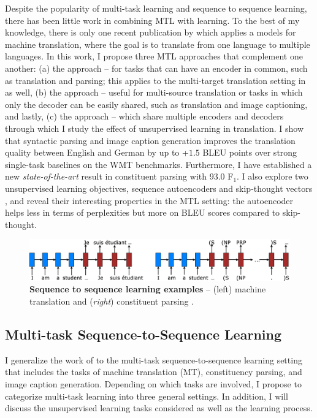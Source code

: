 Despite the popularity of multi-task learning and sequence to sequence
learning, there has been little work in combining MTL with \ssl{}
learning. To the best of my knowledge, there is only one recent
publication by  which applies a \ssl{} models for machine
translation, where the goal is to translate from one language to
multiple languages.
In this work, I propose three MTL
approaches that complement one another: (a) the {\it \otm} approach -- for
tasks that can have an encoder in common, such as translation and parsing; this 
applies to the multi-target translation setting in \cite{dong15} as well, (b)
the {\it \mto} approach -- useful for multi-source
translation or tasks in which only the decoder can be easily shared,
such as translation and image captioning, and lastly, (c) the {\it \mtm} approach -- which share
multiple encoders and decoders through which I study the effect of unsupervised
learning in translation.
I show
that syntactic parsing and image caption generation improves the
translation quality between English and German by up to +$1.5$ BLEU points over
strong single-task baselines on the WMT benchmarks. 
Furthermore, I have established a new {\it state-of-the-art} result in
constituent parsing with 93.0 F$_1$.
I also explore two unsupervised learning
objectives, sequence autoencoders \cite{dai15} and skip-thought vectors
\cite{kiros15skip}, and reveal their interesting properties in the MTL setting: the autoencoder helps less in terms of
  perplexities but more on BLEU scores compared to skip-thought.
\begin{figure}%
\centering
\includegraphics[width=1\textwidth, clip=true, trim= 0 0 0
0]{img/6-1_seq2seq}
\caption[Sequence to sequence learning examples]{{\bf Sequence to sequence learning examples} -- (left) machine
translation \cite{sutskever14} and ({\it right}) constituent parsing
\cite{vinyals15grammar}.}
\label{f:s2s}
\end{figure}

\subsection{Multi-task Sequence-to-Sequence Learning}
\label{subsec:multi}
I generalize the work of \citet{dong15} to the multi-task sequence-to-sequence
learning setting that includes the tasks of machine translation (MT),
constituency parsing, and image caption generation. Depending on which tasks 
are involved, I propose to categorize multi-task \ssl{} learning into three general
settings.
In addition, I will discuss the unsupervised learning tasks considered as well
as the learning process.

